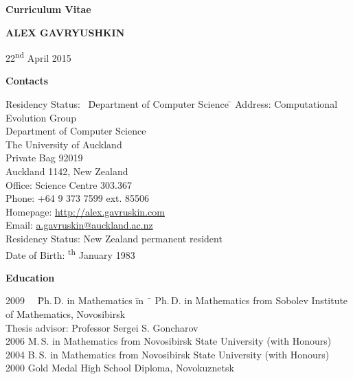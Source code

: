 \documentclass[12pt]{article}
\begin{document}
\centerline{\large \bf Curriculum Vitae}
\vskip5mm
\centerline{\Large \bfseries A\normalsize LEX \Large G\normalsize AVRYUSHKIN}
\vskip5mm
\centerline{22\textsuperscript{nd} April 2015}
\vskip5mm

\centerline{\bf Contacts}
\begin{tabbing}
Residency Status:     \  \= Department of Computer Science \= \kill
Address:        \> Computational Evolution Group \\
		\> Department of Computer Science \\
		\> The University of Auckland\\
                \> Private Bag 92019\\
                \> Auckland 1142, New Zealand\\
Office:         \> Science Centre 303.367\\
Phone:          \> +64 9 373 7599 ext. 85506\\
Homepage:     \> \href{http://alex.gavruskin.com}{http://alex.gavruskin.com}   \\
Email:        \> \href{mailto:a.gavruskin@auckland.ac.nz}{a.gavruskin@auckland.ac.nz} \\
Residency Status:        \>New Zealand permanent resident\\
Date of Birth: \textsuperscript{th} January 1983
\end{tabbing}

\centerline{\bf Education}
\begin{tabbing}
2009 \ \ \= Ph.\,D. in Mathematics \= in \ \=        \> Ph.\,D. in Mathematics \>  from Sobolev Institute of Mathematics, Novosibirsk\\
                \>             \>  Thesis advisor: Professor Sergei S. Goncharov\\
2006       \> M.\,S. in Mathematics \>  from Novosibirsk State University (with Honours)\\
2004       \> B.\,S. in Mathematics \>  from Novosibirsk State University (with Honours)\\
2000       \> Gold Medal High School Diploma, Novokuznetsk\\
\end{tabbing}
\end{document}
